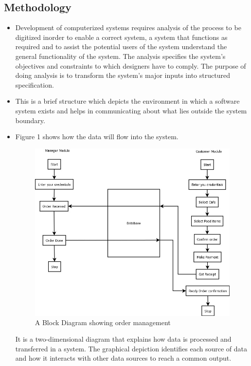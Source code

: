 \documentclass[english]{article}
\begin{document}
\subsection{Methodology}
\begin{itemize}
\item Development of computerized systems requires analysis of the process to be digitized
inorder to enable a correct system, a system that functions as required and to assist
the potential users of the system understand the general functionality of the system.
The analysis specifies the system’s objectives and constraints to which designers have
to comply. The purpose of doing analysis is to transform the system’s major inputs
into structured specification.
\item This is a brief structure which depicts the environment in which a software system
exists and helps in communicating about what lies outside the system boundary.
\item Figure 1 shows how the data will flow into the system.
\begin{figure}[H]
\centering
\includegraphics[scale=0.4]{map.jpeg}
\caption{ A Block Diagram showing order management}
\end{figure}
It is a two-dimensional diagram that explains how data is processed and transferred
in a system. The graphical depiction identifies each source of data and how it interacts
with other data sources to reach a common output.


\end{itemize}
\end{document}
